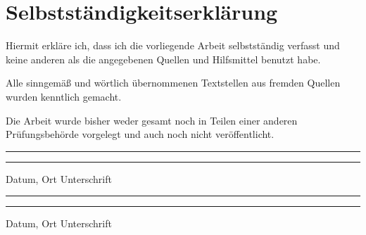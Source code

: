 \newpage
\section*{Selbstständigkeitserklärung}\label{sec:independence}

Hiermit erkläre ich, dass ich die vorliegende Arbeit selbstständig verfasst
und keine anderen als die angegebenen Quellen und Hilfsmittel benutzt
habe.

Alle sinngemäß und wörtlich übernommenen Textstellen aus fremden
Quellen wurden kenntlich gemacht.

Die Arbeit wurde bisher weder gesamt noch in Teilen einer anderen Prüfungsbehörde vorgelegt und auch noch nicht veröffentlicht.

\vspace{40pt}

\noindent\rule{5cm}{.4pt}\hfill\rule{5cm}{.4pt}\par
\noindent Datum, Ort \hfill Unterschrift

\vspace{40pt}

\noindent\rule{5cm}{.4pt}\hfill\rule{5cm}{.4pt}\par
\noindent Datum, Ort \hfill Unterschrift